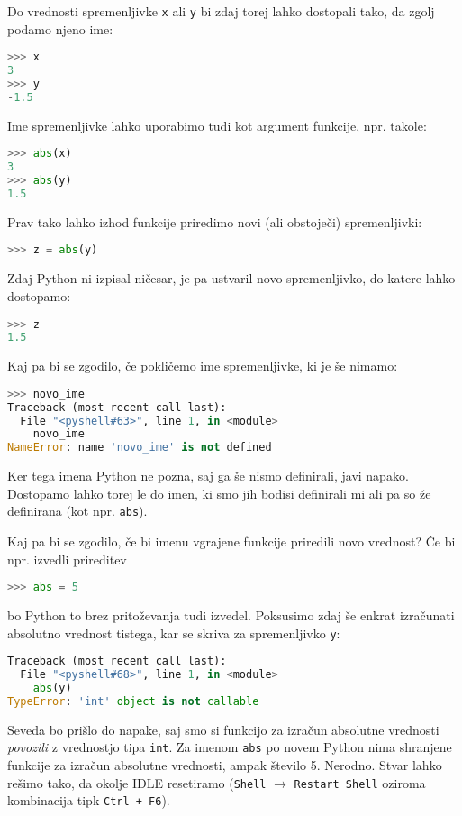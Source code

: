 Do vrednosti spremenljivke \texttt{x} ali \texttt{y} bi zdaj torej lahko dostopali tako, da zgolj podamo njeno ime:
\begin{lstlisting}[language=Python]
>>> x
3
>>> y
-1.5
\end{lstlisting}
Ime spremenljivke lahko uporabimo tudi kot argument funkcije, npr. takole:
\begin{lstlisting}[language=Python]
>>> abs(x)
3
>>> abs(y)
1.5
\end{lstlisting}
Prav tako lahko izhod funkcije priredimo novi (ali obstoječi) spremenljivki:
\begin{lstlisting}[language=Python]
>>> z = abs(y)
\end{lstlisting}
Zdaj Python ni izpisal ničesar, je pa ustvaril novo spremenljivko, do katere lahko dostopamo:
\begin{lstlisting}[language=Python]
>>> z
1.5
\end{lstlisting}
Kaj pa bi se zgodilo, če pokličemo ime spremenljivke, ki je še nimamo:
\begin{lstlisting}[language=Python]
>>> novo_ime
Traceback (most recent call last):
  File "<pyshell#63>", line 1, in <module>
    novo_ime
NameError: name 'novo_ime' is not defined
\end{lstlisting}
Ker tega imena Python ne pozna, saj ga še nismo definirali, javi napako. Dostopamo lahko torej le do imen, ki smo jih bodisi definirali mi ali pa so že definirana (kot npr. \texttt{abs}). 

Kaj pa bi se zgodilo, če bi imenu vgrajene funkcije priredili novo vrednost? Če bi npr. izvedli prireditev
\begin{lstlisting}[language=Python]
>>> abs = 5
\end{lstlisting}
bo Python to brez pritoževanja tudi izvedel. Poksusimo zdaj še enkrat izračunati absolutno vrednost tistega, kar se skriva za spremenljivko \texttt{y}:
\begin{lstlisting}[language=Python]
Traceback (most recent call last):
  File "<pyshell#68>", line 1, in <module>
    abs(y)
TypeError: 'int' object is not callable
\end{lstlisting}
Seveda bo prišlo do napake, saj smo si funkcijo za izračun absolutne vrednosti \emph{povozili} z vrednostjo tipa \texttt{int}. Za imenom \texttt{abs} po novem Python nima shranjene funkcije za izračun absolutne vrednosti, ampak število 5. Nerodno. Stvar lahko rešimo tako, da okolje IDLE resetiramo (\texttt{Shell} $\rightarrow$ \texttt{Restart Shell} oziroma kombinacija tipk \texttt{Ctrl + F6}).

